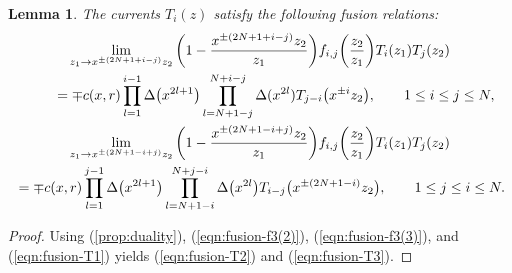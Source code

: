 \documentclass[pdftex]{sigma}
\numberwithin{equation}{section}
\newtheorem{Lemma}[Theorem]{Lemma}
\begin{document}
\begin{Lemma}
The currents $T_i(z)$ satisfy the following fusion relations:\vspace{-1ex}
\begin{gather}
\lim_{z_1 \to x^{\pm (2N+1+i-j)}z_2}
\bigg(1-\frac{x^{\pm (2N+1+i-j)}z_2}{z_1}\bigg)f_{i,j} \bigg(\frac{z_2}{z_1}\bigg)T_i(z_1)T_j(z_2)\notag
\\ \qquad
{}=\mp c(x,r)\prod_{l=1}^{i-1}\Delta\big(x^{2l+1}\big)
\prod_{l=N+1-j}^{N+i-j}\Delta(x^{2l})T_{j-i}\big(x^{\pm i}z_2\big),\qquad
1\leq i \leq j \leq N,
\label{eqn:fusion-T2}
\\
\lim_{z_1 \to x^{\pm (2N+1-i+j)}z_2}
\bigg(1-\frac{x^{\pm (2N+1-i+j)}z_2}{z_1}\bigg)
f_{i,j}\bigg(\frac{z_2}{z_1}\bigg)T_i(z_1)T_j(z_2)\notag
\\
{}=\mp c(x,r)\prod_{l=1}^{j-1}\Delta\big(x^{2l+1}\big)\prod_{l=N+1-i}^{N+j-i}
\Delta\big(x^{2l}\big)T_{i-j}\big(x^{\pm (2N+1-i)}z_2\big),\qquad
1\leq j \leq i \leq N.
\label{eqn:fusion-T3}
\end{gather}
\end{Lemma}

\begin{proof}
Using (\ref{prop:duality}), (\ref{eqn:fusion-f3(2)}), (\ref{eqn:fusion-f3(3)}),
and (\ref{eqn:fusion-T1}) yields (\ref{eqn:fusion-T2}) and (\ref{eqn:fusion-T3}).
\end{proof}
\end{document}
